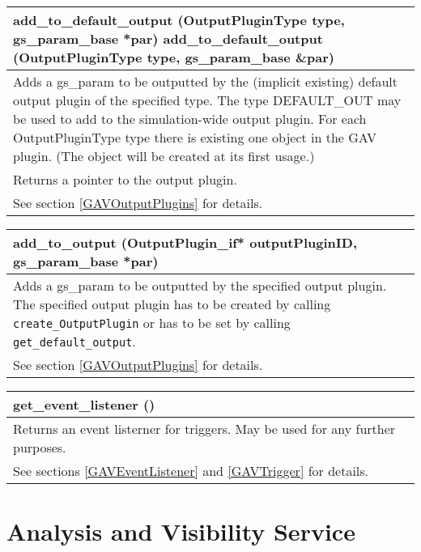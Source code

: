 \begin{tabularx}{\textwidth}{|X|} 
  \hline
  {\sffamily add\_to\_default\_output (OutputPluginType type, gs\_param\_base *par)} \newline 
  {\sffamily add\_to\_default\_output (OutputPluginType type, gs\_param\_base \&par)} \\
  \hline
  Adds a gs\_param to be outputted by the (implicit existing) default output plugin of the specified type. The type {\sffamily DEFAULT\_OUT} may be used to add to the simulation-wide output plugin.
   \newline 
  For each {\sffamily OutputPluginType} type there is existing one object in the GAV plugin. (The object will be created at its first usage.)  \\
  \hline
  Returns a pointer to the output plugin. \\
  \hline
  See section \ref{GAVOutputPlugins} for details. \\
  \hline
\end{tabularx} 

\begin{tabularx}{\textwidth}{|X|} 
  \hline
  {\sffamily add\_to\_output (OutputPlugin\_if* outputPluginID, gs\_param\_base *par)} \\
  \hline
  Adds a gs\_param to be outputted by the specified output plugin.\newline
  The specified output plugin has to be created by calling \lstinline|create_OutputPlugin| or has to be set by calling \lstinline|get_default_output|.  \\
  \hline
  See section \ref{GAVOutputPlugins} for details. \\
  \hline
\end{tabularx} 

\begin{tabularx}{\textwidth}{|X|} 
  \hline
  {\sffamily get\_event\_listener ()} \\
  \hline
  Returns an event listerner for triggers. \newline
  May be used for any further purposes.\\
  \hline
  See sections \ref{GAVEventListener} and \ref{GAVTrigger} for details. \\
  \hline
\end{tabularx} 





\section{Analysis and Visibility Service}
\label{GAVService}


